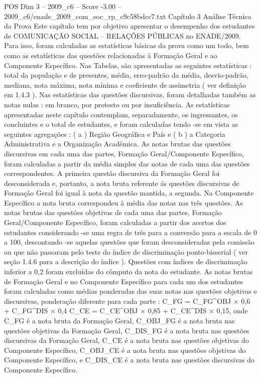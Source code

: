 \begin{textsample}{POS Dim 3 – 2009\_c6 – Score -3.00 – 2009\_c6/enade\_2009\_com\_soc\_rp\_c9c58bdcc7.txt}  \label{ex:f3_pos_244}
Capítulo 3 Análise Técnica da Prova Este capítulo tem por objetivo apresentar o desempenho dos estudantes de COMUNICAÇÃO SOCIAL – RELAÇÕES PÚBLICAS no ENADE/2009.
Para isso, foram calculadas as estatísticas básicas da prova como um todo, bem como as estatísticas das questões relacionadas à Formação Geral e ao Componente Específico.
Nas Tabelas, são apresentadas as seguintes estatísticas : total da população e de presentes, média, erro-padrão da média, desvio-padrão, mediana, nota máxima, nota mínima e coeficiente de assimetria ( ver definição em 1.4.3 ).
Nas estatísticas das questões discursivas, foram detalhadas também as notas nulas : em branco, por protesto ou por insuficiência.
As estatísticas apresentadas neste capítulo contemplam, separadamente, os ingressantes, os concluintes e o total de estudantes, e foram calculadas tendo -se em vista as seguintes agregações : ( a ) Região Geográfica e País e ( b ) a Categoria Administrativa e a Organização Acadêmica.
As notas brutas das questões discursivas em cada uma das partes, Formação Geral/Componente Específico, foram calculadas a partir da média simples das notas de cada uma das questões correspondentes.
A primeira questão discursiva da Formação Geral foi desconsiderada e, portanto, a nota bruta referente ás questões discursivas de Formação Geral foi igual à nota da questão mantida, a segunda.
Na Componente Específico a nota bruta correspondeu à média das notas nas três questões.
As notas brutas das questões objetivas de cada uma das partes, Formação Geral/Componente Específico, foram calculadas a partir dos acertos dos estudantes considerando -se uma regra de três para a conversão para a escala de 0 a 100, descontando -se aquelas questões que foram desconsideradas pela comissão ou que não passaram pelo teste do índice de discriminação ponto-bisserial ( ver seção 1.4.6 para a descrição do índice ).
Questões com índices de discriminação inferior a 0,2 foram excluídas do cômputo da nota do estudante.
As notas brutas de Formação Geral e no Componente Específico para cada um dos estudantes foram calculadas como médias ponderadas das suas notas nas questões objetivas e discursivas, ponderação diferente para cada parte : C\_FG = C\_FG\textasciicircum{}OBJ × 0,6 + C\_FG\textasciicircum{}DIS × 0,4 C\_CE = C\_CE\textasciicircum{}OBJ × 0,85 + C\_CE\textasciicircum{}DIS × 0,15, onde C\_FG é a nota bruta da Formação Geral, C\_OBJ\_FG é a nota bruta nas questões objetivas da Formação Geral, C\_DIS\_FG é a nota bruta nas questões discursivas da Formação Geral, C\_CE é a nota bruta nas questões objetivas do Componente Específico, C\_OBJ\_CE é a nota bruta nas questões objetivas do Componente Específico, e C\_DIS\_CE é a nota bruta nas questões discursivas do Componente Específico.

\end{textsample}
